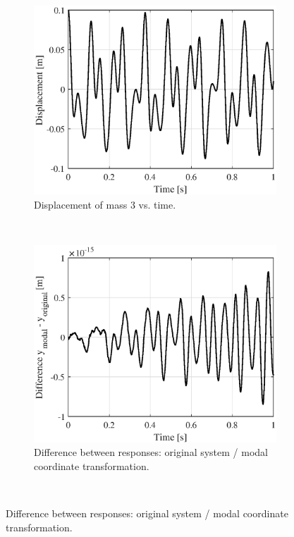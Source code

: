 \documentclass{article}
\begin{document}
	\begin{figure}[h!]
		\centering
		\begin{subfigure}[t]{0.45\textwidth}
			\includegraphics[width=\textwidth]{assignment_rk4_response.eps}
			\caption{Displacement of mass 3 vs. time.}
		\end{subfigure}~
		\begin{subfigure}[t]{0.45\textwidth}
			\includegraphics[width=\textwidth]{assignment_rk4_difference.eps}
			\caption{Difference between responses: original system / modal coordinate transformation.}
		\end{subfigure}\\

\end{figure}
\end{document}
